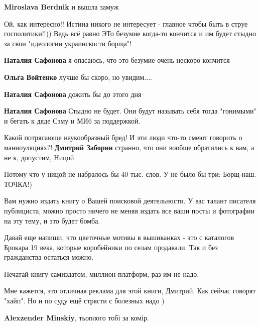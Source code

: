 \begin{itemize}
\begin{itemize} %
\textbf{Miroslava Berdnik} и вышла замуж
\end{itemize} %


Ой, как интересно!! Истина никого не интересует - главное чтобы быть в струе
госполитики!!)) Ведь всё равно ЭТо безумие когда-то кончится и им будет стыдно
за свои "идеологии украинскости борща"!

\begin{itemize} %
\textbf{Наталия Сафонова} я опасаюсь, что это безумие очень нескоро кончится

\textbf{Ольга Войтенко} лучше бы скоро, но увидим....

\textbf{Наталия Сафонова} дожить бы до этого дня

\textbf{Наталия Сафонова} Стыдно не будет. Они будут называть себя тогда "гонимыми" и бегать к дяде Сэму и МИ6 за поддержкой.
\end{itemize} %


Какой потрясающе наукообразный бред! И эти люди что-то смеют говорить о
манипуляциях?! \textbf{Дмитрий Заборин} странно, что они вообще обратились к вам, а не
к, допустим, Ницой

\begin{itemize} %
Потому что у ницой не набралось бы 40 тыс. слов. У не было бы три: Борщ-наш. ТОЧКА!)
\end{itemize} %

Вам нужно издать книгу о Вашей поисковой деятельности. У вас талант писателя публициста, можно просто ничего не меняя издать все ваши посты и фотографии на эту тему, и это будет бомба.

Давай еще напиши, что цветочные мотивы в вышиванках - это с каталогов Брокара 19 века, которые коробейники по селам продавали. Так и без гражданства остаться можно.

Печатай книгу самиздатом, миллион платформ, раз им не надо.

Мне кажется, это отличная реклама для этой книги, Дмитрий. Как сейчас говорят "хайп". Но и по суду ещё стрясти с болезных надо )

\begin{itemize} %
\textbf{Alexzender Minskiy}, тьоплого тобі за комір.


\end{itemize}
\end{itemize}
